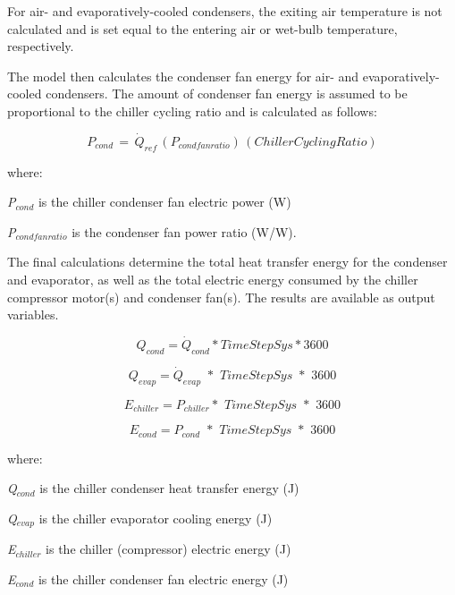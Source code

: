 For air- and evaporatively-cooled condensers, the exiting air temperature is not calculated and is set equal to the entering air or wet-bulb temperature, respectively.

The model then calculates the condenser fan energy for air- and evaporatively-cooled condensers. The amount of condenser fan energy is assumed to be proportional to the chiller cycling ratio and is calculated as follows:

\begin{equation}
{P_{cond}}\, = \,{\dot{Q}_{ref}}\,\left( {{P_{condfanratio}}} \right)\,\left( {ChillerCyclingRatio} \right)
\end{equation}

where:

\emph{P\(_{cond}\)} is the chiller condenser fan electric power (W)

\emph{P\(_{condfanratio}\)} is the condenser fan power ratio (W/W).

The final calculations determine the total heat transfer energy for the condenser and evaporator, as well as the total electric energy consumed by the chiller compressor motor(s) and condenser fan(s). The results are available as output variables.

\begin{equation}
{Q_{cond}} = {\dot{Q}_{cond}}*TimeStepSys*3600
\end{equation}

\begin{equation}
{Q_{evap}} = {\dot{Q}_{evap}}\,\,*\,\,TimeStepSys\,\,*\,\,3600
\end{equation}

\begin{equation}
{E_{chiller}} = {P_{chiller}}*\,\,TimeStepSys\,\,*\,\,3600
\end{equation}

\begin{equation}
{E_{cond}} = {P_{cond}}\,\, * \,\,TimeStepSys\,\,*\,\,3600
\end{equation}

where:

\emph{Q\(_{cond}\)} is the chiller condenser heat transfer energy (J)

\emph{Q\(_{evap}\)} is the chiller evaporator cooling energy (J)

\emph{E\(_{chiller}\)} is the chiller (compressor) electric energy (J)

\emph{E\(_{cond}\)} is the chiller condenser fan electric energy (J)

